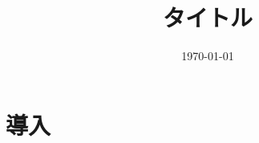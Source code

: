 \documentclass[uplatex,a4paper,dvipdfmx]{jsarticle}
\title{タイトル}
\author{}
\date{\today}
\theoremstyle{definition}
\begin{document}
\maketitle
\section{導入}


% 
% 
\end{document}

